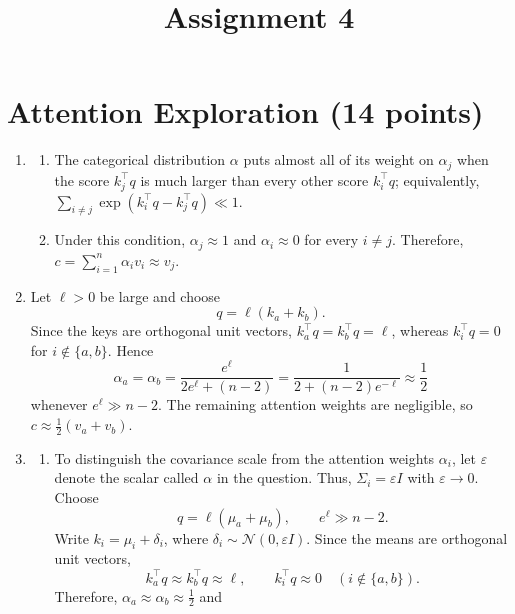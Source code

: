 \documentclass[11pt, a4paper, oneside]{article}
\title{\textbf{Assignment 4}}
\author{}
\date{\empty}
\begin{document}
\maketitle
\section{Attention Exploration (14 points)}
\begin{enumerate}[label=(\alph*), left=0pt, labelsep=1em, itemsep=1em]
    \item 
    \begin{enumerate}[label=\roman*., left=0pt, labelsep=1em, itemsep=1em]
        \item The categorical distribution $\alpha$ puts almost all of its
        weight on $\alpha_j$ when the score $k_j^\top q$ is much larger than
        every other score $k_i^\top q$; equivalently,
        $\sum_{i\neq j}\exp(k_i^\top q-k_j^\top q)\ll 1$.
        \item Under this condition, $\alpha_j\approx 1$ and
        $\alpha_i\approx 0$ for every $i\neq j$. Therefore,
        $c=\sum_{i=1}^n\alpha_i v_i\approx v_j$.
    \end{enumerate}
    \item Let $\ell>0$ be large and choose
    \[
        q=\ell(k_a+k_b).
    \]
    Since the keys are orthogonal unit vectors,
    $k_a^\top q=k_b^\top q=\ell$, whereas $k_i^\top q=0$ for
    $i\notin\{a,b\}$. Hence
    \[
        \alpha_a=\alpha_b
        =\frac{e^\ell}{2e^\ell+(n-2)}
        =\frac{1}{2+(n-2)e^{-\ell}}\approx\frac12
    \]
    whenever $e^\ell\gg n-2$. The remaining attention weights are negligible,
    so $c\approx\frac12(v_a+v_b)$.
    \item \label{1c}
    \begin{enumerate}[label=\roman*., left=0pt, labelsep=1em, itemsep=1em]
        \item To distinguish the covariance scale from the attention weights
        $\alpha_i$, let $\varepsilon$ denote the scalar called $\alpha$ in the
        question. Thus, $\Sigma_i=\varepsilon I$ with $\varepsilon\to0$.
        Choose
        \[
            q=\ell(\mu_a+\mu_b),
            \qquad e^\ell\gg n-2.
        \]
        Write $k_i=\mu_i+\delta_i$, where
        $\delta_i\sim\mathcal N(0,\varepsilon I)$. Since the means are
        orthogonal unit vectors,
        \[
            k_a^\top q\approx k_b^\top q\approx\ell,
            \qquad
            k_i^\top q\approx0\quad(i\notin\{a,b\}).
        \]
        Therefore, $\alpha_a\approx\alpha_b\approx\frac12$ and

\end{enumerate}
\end{enumerate}
\end{document}
